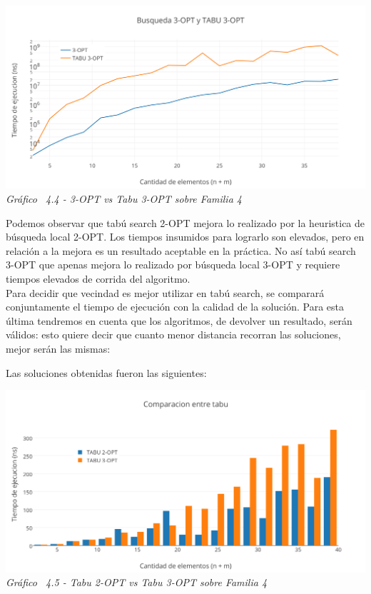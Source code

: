 \vspace*{0.3cm} \vspace*{0.3cm}
  \begin{center}
 \includegraphics[scale=0.5]{./EJ4/medicion3optgym0.png}\\
 {            \textit{Gráfico \ 4.4 - 3-OPT vs Tabu 3-OPT sobre Familia 4}}
  \end{center}
  \vspace*{0.3cm}
  
Podemos observar que tabú search 2-OPT mejora lo realizado por la heuristica de búsqueda local 2-OPT. Los tiempos insumidos para lograrlo son elevados, pero en relación a la mejora es un resultado aceptable en la práctica. No así tabú search 3-OPT que apenas mejora lo realizado por búsqueda local 3-OPT y requiere tiempos elevados de corrida del algoritmo.\\
  
Para decidir que vecindad es mejor utilizar en tabú search, se comparará conjuntamente el tiempo de ejecución con la calidad de la solución. Para esta última tendremos en cuenta que los algoritmos, de devolver un resultado, serán válidos: esto quiere decir que cuanto menor distancia recorran las soluciones, mejor serán las mismas:

Las soluciones obtenidas fueron las siguientes:

\vspace*{0.3cm} \vspace*{0.3cm}
  \begin{center}
 \includegraphics[scale=0.5]{./EJ4/comparativogym0.png}\\
 {            \textit{Gráfico \ 4.5 - Tabu 2-OPT vs Tabu 3-OPT sobre Familia 4}}
  \end{center}
  \vspace*{0.3cm}

